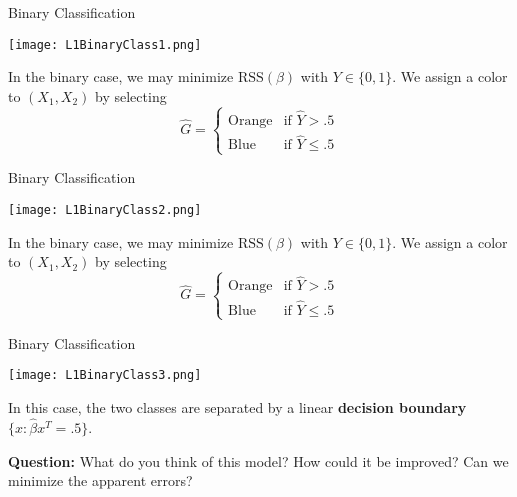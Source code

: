 \documentclass[10pt, handout]{beamer}
\begin{document}
\begin{frame}[fragile]{Binary Classification}
  \begin{minipage}[t][0.5\textheight][t]{\textwidth}
    \centering
     \texttt{[image: L1BinaryClass1.png]}
  \end{minipage}
  \vfill
  \begin{minipage}[t][0.5\textheight][t]{\textwidth}

In the binary case, we may minimize $\text{RSS}(\beta)$ with $Y\in\{0,1\}$. We assign a color to $(X_1,X_2)$ by selecting
$$
\hat G = \begin{cases}
\text{Orange} & \text{if }\hat Y>.5
\\
\text{Blue} & \text{if }\hat Y\leq.5 
\end{cases}
$$

 \end{minipage}
\end{frame}


\begin{frame}[fragile]{Binary Classification}
  \begin{minipage}[t][0.5\textheight][t]{\textwidth}
    \centering
     \texttt{[image: L1BinaryClass2.png]}
  \end{minipage}
  \vfill
  \begin{minipage}[t][0.5\textheight][t]{\textwidth}

In the binary case, we may minimize $\text{RSS}(\beta)$ with $Y\in\{0,1\}$. We assign a color to $(X_1,X_2)$ by selecting
$$
\hat G = \begin{cases}
\text{Orange} & \text{if }\hat Y>.5
\\
\text{Blue} & \text{if }\hat Y\leq.5 
\end{cases}
$$

 \end{minipage}
\end{frame}



\begin{frame}[fragile]{Binary Classification}
  \begin{minipage}[t][0.5\textheight][t]{\textwidth}
    \centering
     \texttt{[image: L1BinaryClass3.png]}
  \end{minipage}
  \vfill
  \begin{minipage}[t][0.5\textheight][t]{\textwidth}

In this case, the two classes are separated by a linear \textbf{decision boundary} $\{x:\hat \beta x^T = .5\}$.\newline

\textbf{Question:} What do you think of this model? How could it be improved? Can we minimize the apparent errors?

 \end{minipage}
\end{frame}
\end{document}
